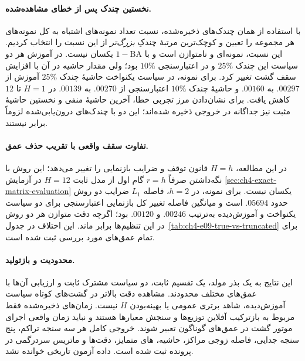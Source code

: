 \paragraph{نخستین چندک پس از خطای مشاهده‌شده.}
با استفاده از همان چندک‌های ذخیره‌شده،
نسبت تعداد نمونه‌های اشتباه به کل نمونه‌های
هر مجموعه را تعیین و کوچک‌ترین مرتبهٔ
چندکِ \emph{بزرگ‌تر} از این نسبت را انتخاب
کردیم. این نسبت، نمونه‌ای و نامتوازن است
و با $1-\mathrm{BA}$ یکسان نیست.
در آموزش هر دو سیاست این چندک $25\%$
و در اعتبارسنجی $10\%$ بود؛
ولی مقدار حاشیه در آن با افزایش سقف گشت
تغییر کرد. برای نمونه، در سیاست یکنواخت
حاشیهٔ چندک $25\%$ آموزش از $.00297$
به $.00160$ و حاشیهٔ چندک $10\%$
اعتبارسنجی از $.00270$ به $.00139$
در $H=1$ تا $12$ کاهش یافت.
برای نشان‌دادن مرز تجربی خطا،
آخرین حاشیهٔ منفی و نخستین حاشیهٔ مثبت
نیز جداگانه در خروجی ذخیره شده‌اند؛
این دو با چندک‌های درون‌یابی‌شده
لزوماً برابر نیستند.




\paragraph{تفاوت سقف واقعی با تقریب حذف عمق.}
در این مطالعه، $H=h$ قانون توقف و ضرایب
بازنمایی را تغییر می‌دهد؛ این روش با
نگه‌داشتن صرفاً $r=h$ گام اول
از مدل ثابت $H=12$ در آزمایش
\ref{sec:ch4-exact-matrix-evaluation}
یکسان نیست. برای نمونه، در $h=2$،
فاصله $L_1$ ضرایب دو روش حدود $.05694$
است و میانگین فاصله تغییر کل بازنمایی
اعتبارسنجی برای دو سیاست یکنواخت و
آموزش‌دیده به‌ترتیب $.00246$ و $.00120$
بود؛ اگرچه دقت متوازن هر دو روش در این
تنظیم‌ها برابر ماند. این اختلاف در
جدول~\ref{tab:ch4-e09-true-vs-truncated}
برای تمام عمق‌های مورد بررسی ثبت شده است.


\paragraph{محدودیت و بازتولید.}
این نتایج به یک بذر مولد، یک تقسیم ثابت،
دو سیاست مشترک ثابت و ارزیابی آن‌ها
با عمق‌های مختلف محدودند. مشاهده دقت بالاتر
در گشت‌های کوتاه سیاست آموزش‌دیده،
شاهد برتری عمومی یا بهینه‌بودن $H$
نیست. زمان‌های ذخیره‌شده فقط مربوط به
بازترکیب آفلاین توزیع‌ها و سنجش معیارها
هستند و نباید زمان واقعی اجرای موتور گشت
در عمق‌های گوناگون تعبیر شوند.
خروجی کامل هر سه سنجه تراکم، پنج سنجه جدایی،
فاصله زوجی مراکز، حاشیه، های متمایز،
دقت‌ها و ماتریس سردرگمی در پرونده
ثبت شده است. داده آزمون تاریخی خوانده نشد.


